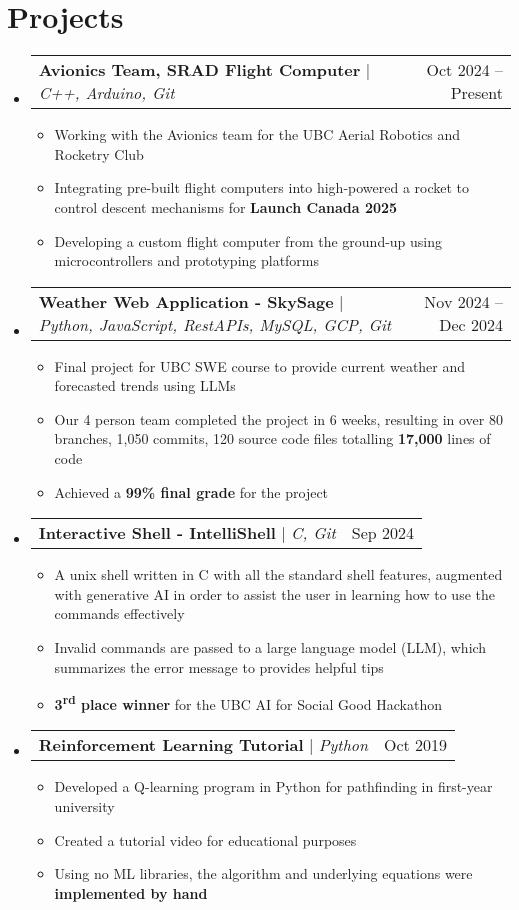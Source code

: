 \documentclass[letterpaper,11.5pt]{article}
\makeatletter
\newcommand{\resumeItem}[1]{
  \item\small{
    {#1 \vspace{-2pt}}
  }
}
\newcommand{\resumeProjectHeading}[2]{
    \item
    \begin{tabular*}{0.97\textwidth}{l@{\extracolsep{\fill}}r}
      \small#1 & #2 \\
    \end{tabular*}\vspace{-7pt}
}
\newcommand{\resumeSubHeadingListStart}{\begin{itemize}[leftmargin=0.15in, label={}]}
\newcommand{\resumeSubHeadingListEnd}{\end{itemize}}
\newcommand{\resumeItemListStart}{\begin{itemize}}
\newcommand{\resumeItemListEnd}{\end{itemize}\vspace{-5pt}}
\def\projectSpaceBefore{1pt}
\makeatother
\begin{document}
\section{Projects}
    \resumeSubHeadingListStart
      \resumeProjectHeading
          {\textbf{Avionics Team, SRAD Flight Computer} $|$ \emph{C++, Arduino, Git}}{Oct 2024 -- Present}
          \resumeItemListStart
            \vspace{\projectSpaceBefore}
            \resumeItem{Working with the Avionics team for the UBC Aerial Robotics and Rocketry Club}
            \resumeItem{Integrating pre-built flight computers into high-powered a rocket to control descent mechanisms for \textbf{Launch Canada 2025}}
            \resumeItem{Developing a custom flight computer from the ground-up using microcontrollers and prototyping platforms}
          \resumeItemListEnd
      \resumeProjectHeading
          {\textbf{Weather Web Application - SkySage} $|$ \emph{Python, JavaScript, RestAPIs, MySQL, GCP, Git}}{Nov 2024 -- Dec 2024}
          \resumeItemListStart
            \vspace{\projectSpaceBefore}
            \resumeItem{Final project for UBC SWE course to provide current weather and forecasted trends using LLMs}
            \resumeItem{Our 4 person team completed the project in 6 weeks, resulting in over 80 branches, 1,050 commits, 120 source code files totalling \textbf{17,000} lines of code}
            \resumeItem{Achieved a \textbf{99\% final grade} for the project}
          \resumeItemListEnd
      \resumeProjectHeading
          {\textbf{Interactive Shell - IntelliShell} $|$ \emph{C, Git}}{Sep 2024}
          \resumeItemListStart
            \vspace{\projectSpaceBefore}
            \resumeItem{A unix shell written in C with all the standard shell features, augmented with generative AI in order to assist the user in learning how to use the commands effectively}
            \resumeItem{Invalid commands are passed to a large language model (LLM), which summarizes the error message to provides helpful tips}
            \resumeItem{\textbf{3\textsuperscript{rd} place winner} for the UBC AI for Social Good Hackathon}
          \resumeItemListEnd
      \resumeProjectHeading
          {\textbf{Reinforcement Learning Tutorial} $|$ \emph{Python}}{Oct 2019}
          \resumeItemListStart
            \vspace{\projectSpaceBefore}
            \resumeItem{Developed a Q-learning program in Python for pathfinding in first-year university}
            \resumeItem{Created a tutorial video for educational purposes}
            \resumeItem{Using no ML libraries, the algorithm and underlying equations were \textbf{implemented by hand}}
          \resumeItemListEnd
    \resumeSubHeadingListEnd
\end{document}
